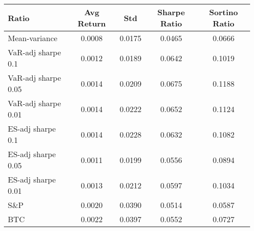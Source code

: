 \begin{tabular}{lcccc}
\toprule
Ratio & Avg Return & Std & Sharpe Ratio & Sortino Ratio\\
\midrule
Mean-variance & 0.0008 & 0.0175 & 0.0465 & 0.0666\\
VaR-adj sharpe 0.1 & 0.0012 & 0.0189 & 0.0642 & 0.1019\\
VaR-adj sharpe 0.05 & 0.0014 & 0.0209 & 0.0675 & 0.1188\\
VaR-adj sharpe 0.01 & 0.0014 & 0.0222 & 0.0652 & 0.1124\\
ES-adj sharpe 0.1 & 0.0014 & 0.0228 & 0.0632 & 0.1082\\
ES-adj sharpe 0.05 & 0.0011 & 0.0199 & 0.0556 & 0.0894\\
ES-adj sharpe 0.01 & 0.0013 & 0.0212 & 0.0597 & 0.1034\\
S\&P & 0.0020 & 0.0390 & 0.0514 & 0.0587\\
BTC & 0.0022 & 0.0397 & 0.0552 & 0.0727\\
\bottomrule
\end{tabular}
